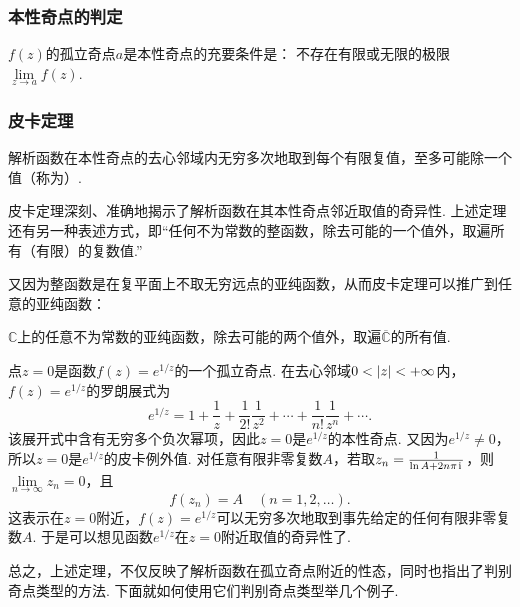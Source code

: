 \subsubsection{本性奇点的判定}
\begin{theorem}
\(f(z)\)的孤立奇点\(a\)是本性奇点的充要条件是：
不存在有限或无限的极限\(\lim\limits_{z \to a} f(z)\).
\end{theorem}

\subsubsection{皮卡定理}
\begin{theorem}[皮卡定理]
解析函数在本性奇点的去心邻域内无穷多次地取到每个有限复值，至多可能除一个值（称为）.
\end{theorem}
皮卡定理深刻、准确地揭示了解析函数在其本性奇点邻近取值的奇异性.
上述定理还有另一种表述方式，即“任何不为常数的整函数，除去可能的一个值外，取遍所有（有限）的复数值.”

又因为整函数是在复平面上不取无穷远点的亚纯函数，从而皮卡定理可以推广到任意的亚纯函数：\begin{theorem}
\(\mathbb{C}\)上的任意不为常数的亚纯函数，除去可能的两个值外，取遍\(\overline{\mathbb{C}}\)的所有值.
\end{theorem}

\begin{example}
点\(z=0\)是函数\(f(z) = e^{1/z}\)的一个孤立奇点.
在去心邻域\(0<\abs{z}<+\infty\)内，\(f(z) = e^{1/z}\)的罗朗展式为\[
e^{1/z} = 1 + \frac{1}{z} + \frac{1}{2!} \frac{1}{z^2} + \dotsb + \frac{1}{n!} \frac{1}{z^n} + \dotsb.
\]该展开式中含有无穷多个负次幂项，因此\(z=0\)是\(e^{1/z}\)的本性奇点.
又因为\(e^{1/z}\neq0\)，所以\(z=0\)是\(e^{1/z}\)的皮卡例外值.
对任意有限非零复数\(A\)，若取\(z_n = \frac{1}{\ln A + 2n\pi\kern1pt\mathrm{i}\kern1pt}\)，则\(\lim\limits_{n\to\infty} z_n = 0\)，且\[
f(z_n) = A
\quad(n=1,2,\dotsc).
\]这表示在\(z=0\)附近，\(f(z) = e^{1/z}\)可以无穷多次地取到事先给定的任何有限非零复数\(A\).
于是可以想见函数\(e^{1/z}\)在\(z=0\)附近取值的奇异性了.
\end{example}

总之，上述定理，不仅反映了解析函数在孤立奇点附近的性态，同时也指出了判别奇点类型的方法.
下面就如何使用它们判别奇点类型举几个例子.

